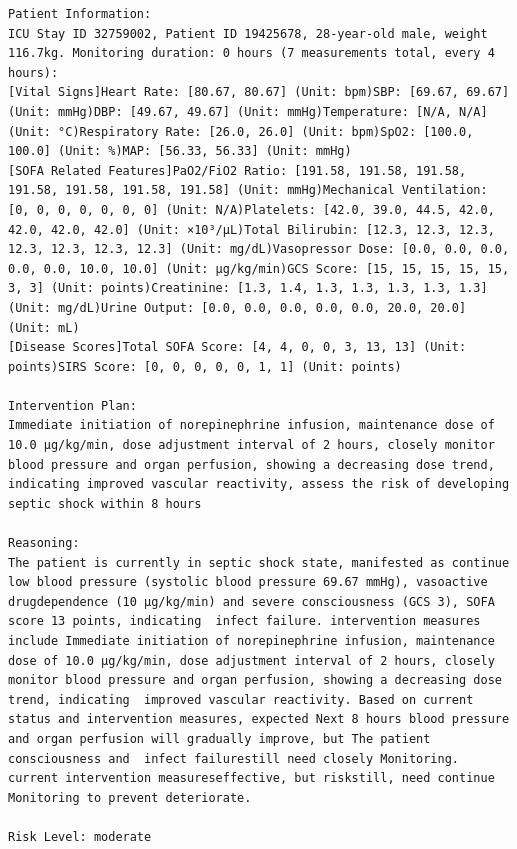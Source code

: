 \documentclass{article}
\begin{document}
\begin{lstlisting}[caption={Result for Patient 32759002}, label={lst:32759002}]
Patient Information:
ICU Stay ID 32759002, Patient ID 19425678, 28-year-old male, weight 116.7kg. Monitoring duration: 0 hours (7 measurements total, every 4 hours):
[Vital Signs]Heart Rate: [80.67, 80.67] (Unit: bpm)SBP: [69.67, 69.67] (Unit: mmHg)DBP: [49.67, 49.67] (Unit: mmHg)Temperature: [N/A, N/A] (Unit: °C)Respiratory Rate: [26.0, 26.0] (Unit: bpm)SpO2: [100.0, 100.0] (Unit: %)MAP: [56.33, 56.33] (Unit: mmHg)
[SOFA Related Features]PaO2/FiO2 Ratio: [191.58, 191.58, 191.58, 191.58, 191.58, 191.58, 191.58] (Unit: mmHg)Mechanical Ventilation: [0, 0, 0, 0, 0, 0, 0] (Unit: N/A)Platelets: [42.0, 39.0, 44.5, 42.0, 42.0, 42.0, 42.0] (Unit: ×10³/μL)Total Bilirubin: [12.3, 12.3, 12.3, 12.3, 12.3, 12.3, 12.3] (Unit: mg/dL)Vasopressor Dose: [0.0, 0.0, 0.0, 0.0, 0.0, 10.0, 10.0] (Unit: μg/kg/min)GCS Score: [15, 15, 15, 15, 15, 3, 3] (Unit: points)Creatinine: [1.3, 1.4, 1.3, 1.3, 1.3, 1.3, 1.3] (Unit: mg/dL)Urine Output: [0.0, 0.0, 0.0, 0.0, 0.0, 20.0, 20.0] (Unit: mL)
[Disease Scores]Total SOFA Score: [4, 4, 0, 0, 3, 13, 13] (Unit: points)SIRS Score: [0, 0, 0, 0, 0, 1, 1] (Unit: points)

Intervention Plan:
Immediate initiation of norepinephrine infusion, maintenance dose of 10.0 μg/kg/min, dose adjustment interval of 2 hours, closely monitor blood pressure and organ perfusion, showing a decreasing dose trend, indicating improved vascular reactivity, assess the risk of developing septic shock within 8 hours

Reasoning:
The patient is currently in septic shock state, manifested as continue low blood pressure (systolic blood pressure 69.67 mmHg), vasoactive drugdependence (10 μg/kg/min) and severe consciousness (GCS 3), SOFA score 13 points, indicating  infect failure. intervention measures include Immediate initiation of norepinephrine infusion, maintenance dose of 10.0 μg/kg/min, dose adjustment interval of 2 hours, closely monitor blood pressure and organ perfusion, showing a decreasing dose trend, indicating  improved vascular reactivity. Based on current status and intervention measures, expected Next 8 hours blood pressure and organ perfusion will gradually improve, but The patient consciousness and  infect failurestill need closely Monitoring. current intervention measureseffective, but riskstill, need continue Monitoring to prevent deteriorate.

Risk Level: moderate
\end{lstlisting}
\end{document}
